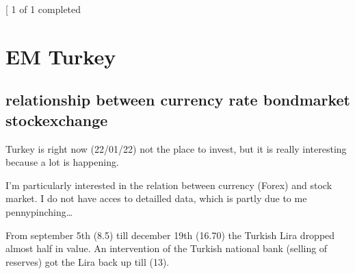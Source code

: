 \documentclass[letterpaper,10pt,english]{sphinxmanual}
\begin{document}
\begin{sphinxVerbatim}[commandchars=\\\{\}]
\end{sphinxVerbatim}

\noindent{}

\sphinxAtStartPar
{}
\begin{sphinxalltt}
{[}\sphinxstylestrong{*******************100\%*********************}{]}  1 of 1 completed
\end{sphinxalltt}

\begin{sphinxVerbatim}[commandchars=\\\{\}]
\end{sphinxVerbatim}

\noindent{}

\sphinxAtStartPar
{}


\chapter{EM Turkey}
\label{\detokenize{turkey:em-turkey}}\label{\detokenize{turkey::doc}}

\section{relationship between currency rate \sphinxhyphen{} bondmarket \sphinxhyphen{} stockexchange}
\label{\detokenize{turkey:relationship-between-currency-rate-bondmarket-stockexchange}}
\sphinxAtStartPar
Turkey is right now (22/01/22) not the place to invest, but it is really
interesting because a lot is happening.

\sphinxAtStartPar
I’m particularly interested in the relation between currency (Forex) and
stock market. I do not have acces to detailled data, which is partly due
to me pennypinching…

\sphinxAtStartPar
From september 5th (8.5) till december 19th (16.70) the Turkish Lira
dropped almost half in value. An intervention of the Turkish national
bank (selling of reserves) got the Lira back up till (13).
\end{document}

